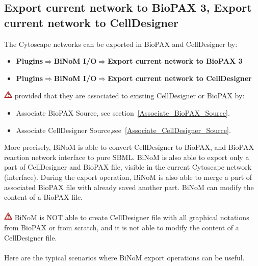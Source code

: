 \subsection{Export current network to BioPAX 3, Export current network to CellDesigner} \label{Export_current_network}
The Cytoscape networks can be exported in BioPAX and CellDesigner by:
\begin{itemize}
\item \textbf{Plugins$\Rightarrow$BiNoM I/O$\Rightarrow$Export current network to BioPAX 3}
\item \textbf{Plugins$\Rightarrow$BiNoM I/O$\Rightarrow$Export current network to CellDesigner}
\end{itemize}
\includegraphics[width=12pt,height=12pt]{graphics/warning} provided that they are associated to existing CellDesigner or BioPAX by:
\begin{itemize}
\item Associate BioPAX Source, see section~\ref{Associate_BioPAX_Source}.
\item Associate CellDesigner Source,see~\ref{Associate_CellDesigner_Source}.
\end{itemize}
More precisely, BiNoM is able to convert CellDesigner to BioPAX, and BioPAX reaction network interface to pure SBML. BiNoM is also able to export only a part of CellDesigner and BioPAX file, visible in the current Cytoscape network (interface). During the export operation, BiNoM is also able to merge a part of associated BioPAX file with already saved another part. BiNoM can modify the content of a BioPAX file. \\\\
\includegraphics[width=12pt,height=12pt]{graphics/warning} BiNoM is NOT able to create CellDesigner file with all graphical notations from BioPAX or from scratch, and it is not able to modify the content of a CellDesigner file.\\\\
Here are the typical scenarios where BiNoM export operations can be useful.
